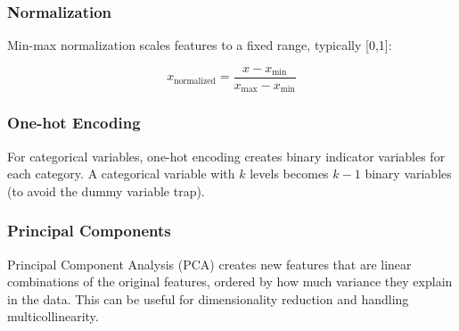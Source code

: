 \subsubsection{Normalization}

Min-max normalization scales features to a fixed range, typically [0,1]:

\begin{equation}
x_{\text{normalized}} = \frac{x - x_{\min}}{x_{\max} - x_{\min}}
\label{eq:normalization}
\end{equation}

\subsubsection{One-hot Encoding}

For categorical variables, one-hot encoding creates binary indicator variables for each category. A categorical variable with $k$ levels becomes $k-1$ binary variables (to avoid the dummy variable trap).

\subsubsection{Principal Components}

Principal Component Analysis (PCA) creates new features that are linear combinations of the original features, ordered by how much variance they explain in the data. This can be useful for dimensionality reduction and handling multicollinearity.